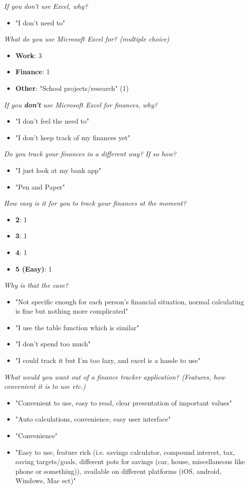 \documentclass{article}
\begin{document}
\textit{If you don't use Excel, why?}
\begin{itemize}
    \item "I don't need to"
\end{itemize}
\textit{What do you use Microsoft Excel for? (multiple choice)}
\begin{itemize}
    \item \textbf{Work}: 3
    \item \textbf{Finance}: 1
    \item \textbf{Other}: "School projects/research" (1)
\end{itemize}
\textit{If you \textbf{don't} use Microsoft Excel for finances, why?}
\begin{itemize}
    \item "I don't feel the need to"
    \item "I don’t keep track of my finances yet"
\end{itemize}
\textit{Do you track your finances in a different way? If so how?}
\begin{itemize}
    \item "I just look at my bank app"
    \item "Pen and Paper"
\end{itemize}
\textit{How easy is it for you to track your finances at the moment?}
\begin{itemize}
    \item \textbf{2}: 1
    \item \textbf{3}: 1
    \item \textbf{4}: 1
    \item \textbf{5 (Easy)}: 1
\end{itemize}
\textit{Why is that the case?}
\begin{itemize}
    \item "Not specific enough for each person's financial situation, normal calculating is fine but nothing more complicated"
    \item "I use the table function which is similar"
    \item "I don't spend too much"
    \item "I could track it but I’m too lazy, and excel is a hassle to use"
\end{itemize}
\textit{What would you want out of a finance tracker application? (Features, how
convenient it is to use etc.)}
\begin{itemize}
    \item "Convenient to use, easy to read, clear presentation of important values"
    \item "Auto calculations, convenience, easy user interface"
    \item "Convenience"
    \item "Easy to use, feature rich (i.e. savings calculator, compound interest, tax, saving targets/goals, different pots for savings (car, house, miscellaneous like phone or something)), available on different platforms (iOS, android, Windows, Mac ect)"
\end{itemize}
\end{document}
